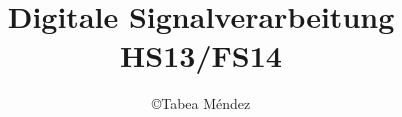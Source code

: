 % 
% 
% 
% 
%


\makeindex
\makeglossary
\newcommand{\autor}{\copyright Tabea Méndez}
\author{\autor}
\newcommand{\titel}{Digitale Signalverarbeitung HS13/FS14}
\title{\titel}

\usepackage[parfill]{parskip}
\usepackage{amssymb}
\usepackage{bbm}
\usepackage{trfsigns}
\usepackage{pdflscape}
\usepackage{trfsigns}
\usepackage{graphics}
\usepackage{graphicx}
\usepackage{array}


